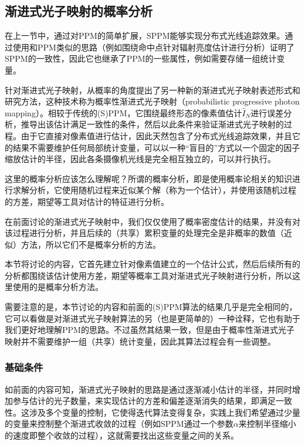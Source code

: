 \subsection{渐进式光子映射的概率分析}\label{sec:pm-probabilistic-ppm}
在上一节中，通过对PPM的简单扩展，SPPM能够实现分布式光线追踪效果。\cite{a:StochasticProgressivePhotonMapping}通过使用和PPM类似的思路（例如围绕命中点针对辐射亮度估计进行分析）证明了SPPM的一致性，因此它也继承了PPM的一些属性，例如需要存储一组统计变量。

针对渐进式光子映射，\cite{a:ProgressivePhotonMappingAProbabilisticApproach}从概率的角度提出了另一种新的渐进式光子映射表述形式和研究方法，这种技术称为概率性渐进式光子映射（probabilistic progressive photon mapping）。相较于传统的(S)PPM，它围绕最终形态的像素值估计$\hat{I}_N$进行误差分析，推导出该估计满足一致性的条件，然后以此条件来验证渐进式光子映射的过程。由于它直接对像素值进行估计，因此天然包含了分布式光线追踪效果，并且它的结果不需要维护任何局部统计变量，可以以一种“盲目的”方式以一个固定的因子缩放估计的半径，因此各条摄像机光线是完全相互独立的，可以并行执行。

\begin{myshaded}
	这里的概率分析应该怎么理解呢？所谓的概率分析，即是使用概率论相关的知识进行求解分析，它使用随机过程来近似某个解（称为一个估计），并使用该随机过程的方差，期望等工具对估计的特征进行分析。
	
	在前面讨论的渐进式光子映射中，我们仅仅使用了概率密度估计的结果，并没有对该过程进行分析，并且后续的（共享）累积变量的处理完全是非概率的数值（近似）方法，所以它们不是概率分析的方法。
	
	本节将讨论的内容，它首先建立针对像素值建立的一个估计公式，然后后续所有的分析都围绕该估计使用方差，期望等概率工具对渐进式光子映射进行分析，所以这里使用的是概率分析方法。
\end{myshaded}

需要注意的是，本节讨论的内容和前面的(S)PPM算法的结果几乎是完全相同的，它可以看做是对渐进式光子映射算法的另（也是更简单的）一种诠释，它也有助于我们更好地理解PPM的思路。不过虽然其结果一致，但是由于概率性渐进式光子映射并不需要维护一组（共享）统计变量，因此其算法过程会有一些调整。




\subsubsection{基础条件}\label{sec:pm-ppm-basis}
如前面的内容可知，渐进式光子映射的思路是通过逐渐减小估计的半径，并同时增加参与估计的光子数量，来实现估计的方差和偏差逐渐消失的结果，即满足一致性。这涉及多个变量的控制，它使得迭代算法变得复杂，实践上我们希望通过少量的变量来控制整个渐进式收敛的过程（例如SPPM通过一个参数$\alpha$来控制半径缩小的速度即整个收敛的过程），这就需要找出这些变量之间的关系。

